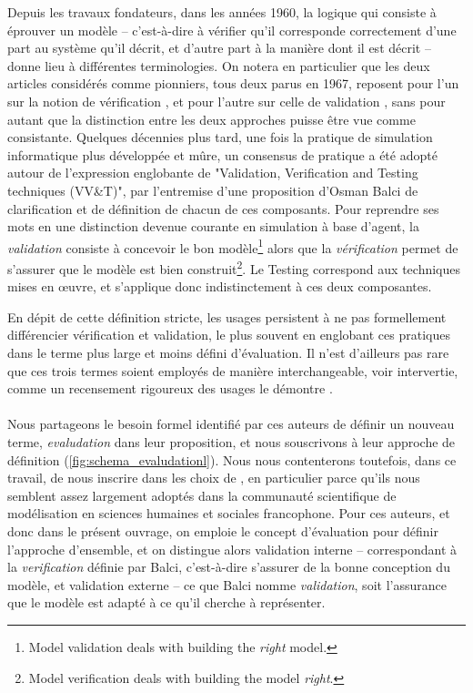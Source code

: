 Depuis les travaux fondateurs, dans les années 1960, la logique qui consiste à éprouver un modèle -- c'est-à-dire à vérifier qu'il corresponde correctement d'une part au système qu'il décrit, et d'autre part à la manière dont il est décrit -- donne lieu à différentes terminologies.
On notera en particulier que les deux articles considérés comme pionniers, tous deux parus en 1967, reposent pour l'un sur la notion de vérification \autocite{naylor_verification_1967}, et pour l'autre sur celle de validation \autocite{hermann_validation_1967}, sans pour autant que la distinction entre les deux approches puisse être vue comme consistante.
Quelques décennies plus tard, une fois la pratique de simulation informatique plus développée et mûre, un consensus de pratique a été adopté autour de l'expression englobante de "Validation, Verification and Testing techniques (VV\&T)", par l'entremise d'une proposition d'Osman Balci \autocite{balci_validation_1994} de clarification et de définition de chacun de ces composants.
Pour reprendre ses mots en une distinction devenue courante en simulation à base d'agent, la \textit{validation} consiste à concevoir le bon modèle\footnote{\og Model validation deals with building the \textit{right} model.\fg{}} alors que la \textit{vérification} permet de s'assurer que le modèle est bien construit\footnote{\og Model verification deals with building the model \textit{right}.\fg{}}.
Le \og Testing\fg{} correspond aux techniques mises en œuvre, et s'applique donc indistinctement à ces deux composantes.

En dépit de cette définition stricte, les usages persistent à ne pas formellement différencier vérification et validation, le plus souvent en englobant ces pratiques dans le terme plus large et moins défini d'\og évaluation\fg{}.
Il n'est d'ailleurs pas rare que ces trois termes soient employés de manière interchangeable, voir intervertie, comme un recensement rigoureux des usages le démontre \autocite[Table 1, p. 120]{augusiak_merging_2014}.

\paragraph*{}
Nous partageons le besoin formel identifié par ces auteurs de définir un nouveau terme, \og \textit{evaludation} \fg{} dans leur proposition, et nous souscrivons à leur approche de définition (\cref{fig:schema_evaludationl}).
Nous nous contenterons toutefois, dans ce travail, de nous inscrire dans les choix de \cite{amblard_assessment_2007}, en particulier parce qu'ils nous semblent assez largement adoptés dans la communauté scientifique de modélisation en sciences humaines et sociales francophone.
Pour ces auteurs, et donc dans le présent ouvrage, on emploie le concept d'évaluation pour définir l'approche d'ensemble, et on distingue alors \og validation interne\fg{} -- correspondant à la \textit{verification} définie par Balci, c'est-à-dire s'assurer de la bonne conception du modèle, et \og validation externe\fg{} -- ce que Balci nomme \textit{validation}, soit l'assurance que le modèle est adapté à ce qu'il cherche à représenter.


